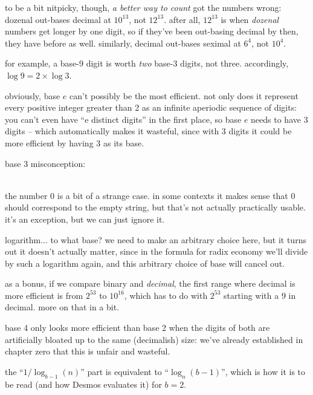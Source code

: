 \documentclass[../footnotes.tex]{subfiles}
\begin{document}

\myfootnote{} to be a bit nitpicky, though, {\it a better way to count} got the numbers wrong: dozenal out-bases decimal at $10^{13}$, not $12^{13}$. after all, $12^{13}$ is when \emph{dozenal} numbers get longer by one digit, so if they've been out-basing decimal by then, they have before as well. similarly, decimal out-bases seximal at $6^4$, not $10^4$.

\myfootnote{} for example, a base-9 digit is worth \emph{two} base-3 digits, not three. accordingly, $\log 9 = 2 \times \log 3$.

\myfootnote{} obviously, base $e$ can't possibly be the most efficient. not only does it represent every positive integer greater than 2 as an infinite aperiodic sequence of digits: you can't even have ``e distinct digits'' in the first place, so base $e$ needs to have 3 digits -- which automatically makes it wasteful, since with 3 digits it could be more efficient by having 3 as its base.

\myfootnote{} base 3 misconception: \\
 \\

\myfootnote{} the number 0 is a bit of a strange case. in some contexts it makes sense that 0 should correspond to the empty string, but that's not actually practically usable. it's an exception, but we can just ignore it.

\myfootnote{} logarithm... to what base? we need to make an arbitrary choice here, but it turns out it doesn't actually matter, since in the formula for radix economy we'll divide by such a logarithm again, and this arbitrary choice of base will cancel out.

\myfootnote{} as a bonus, if we compare binary and \emph{decimal}, the first range where decimal is more efficient is from $2^{53}$ to $10^{16}$, which has to do with $2^{53}$ starting with a 9 in decimal. more on that in a bit.

\myfootnote{} base 4 only looks more efficient than base 2 when the digits of both are artificially bloated up to the same (decimalish) size: we've already established in chapter zero that this is unfair and wasteful.

\myfootnote{} the ``$1 / \log_{b-1}(n)$'' part is equivalent to ``$\log_n(b - 1)$'', which is how it is to be read (and how Desmos evaluates it) for $b = 2$.
\end{document}
